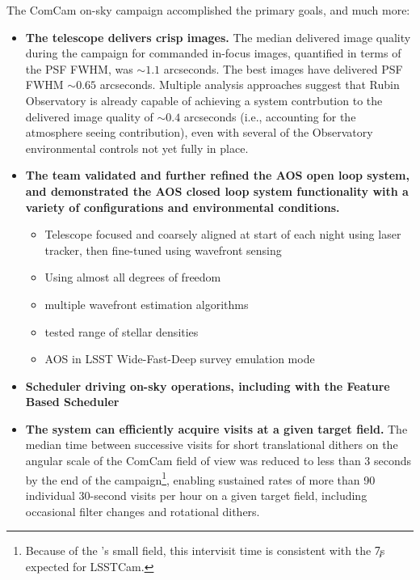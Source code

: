 The ComCam on-sky campaign accomplished the primary goals, and much more:

\begin{itemize}
    \item \textbf{The telescope delivers crisp images.}
    The median delivered image quality during the campaign for commanded in-focus images, quantified in terms of the PSF FWHM, was $\sim1.1$ arcseconds.
    The best images have delivered PSF FWHM $\sim0.65$ arcseconds.
    Multiple analysis approaches suggest that Rubin Observatory is already capable of achieving a system contrbution to the delivered image quality of $\sim0.4$ arcseconds (i.e., accounting for the atmosphere seeing contribution), even with several of the Observatory environmental controls not yet fully in place.
    \item \textbf{The team validated and further refined the AOS open loop system, and demonstrated the AOS closed loop system functionality with a variety of configurations and environmental conditions.}
    \begin{itemize}
        \item Telescope focused and coarsely aligned at start of each night using laser tracker,
          then fine-tuned using wavefront sensing
        \item Using almost all degrees of freedom
        \item multiple wavefront estimation algorithms
        \item tested range of stellar densities
        \item AOS in LSST Wide-Fast-Deep survey emulation mode
    \end{itemize}
    \item \textbf{Scheduler driving on-sky operations, including with the Feature Based Scheduler}
    \item \textbf{The system can efficiently acquire visits at a given target field.} The median time between
      successive visits for short translational dithers on the angular scale of the ComCam field of view was
      reduced to less than 3 seconds by the end of the campaign\footnote{Because of the \ComCam's small field,
        this intervisit time is consistent with the \c 7s expected for LSSTCam.}, enabling sustained rates of more than 90 individual 30-second visits per hour on a given target field, including occasional filter changes and rotational dithers.

\end{itemize}
